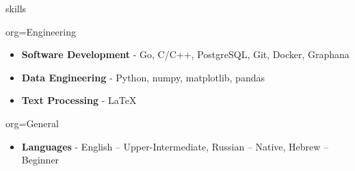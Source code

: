 \documentclass{resume}
\begin{document}
\makeheader

\begin{ResumeSection}{skills}
    \newcommand{\skill}[2]{\textbf{#1} - #2}
    \begin{ResumeSubsection}{org=Engineering}
        \begin{itemize}
            \item \skill{Software Development}{Go, C/C++, PostgreSQL, Git, Docker, Graphana}
            \item \skill{Data Engineering}{Python, numpy, matplotlib, pandas}
            \item \skill{Text Processing}{LaTeX}
        \end{itemize}
    \end{ResumeSubsection}

    \begin{ResumeSubsection}{org=General}
        \begin{itemize}
            \item \skill{Languages}{English -- Upper-Intermediate, Russian -- Native, Hebrew -- Beginner}
        \end{itemize}
    \end{ResumeSubsection}
\end{ResumeSection}
\end{document}

